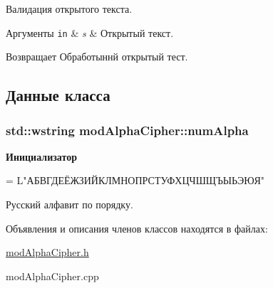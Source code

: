 Валидация открытого текста. 


\begin{DoxyParams}[1]{Аргументы}
\mbox{\tt in}  & {\em s} & Открытый текст. \\
\hline
\end{DoxyParams}
\begin{DoxyReturn}{Возвращает}
Обработыннй открытый тест. 
\end{DoxyReturn}


\subsection{Данные класса}
\subsubsection[{\texorpdfstring{num\+Alpha}{numAlpha}}]{\setlength{\rightskip}{0pt plus 5cm}std\+::wstring mod\+Alpha\+Cipher\+::num\+Alpha\hspace{0.3cm}{\ttfamily [private]}}\hypertarget{classmodAlphaCipher_ab7e0c7d3c87f4c8b7435d84f31c6cb62}{}\label{classmodAlphaCipher_ab7e0c7d3c87f4c8b7435d84f31c6cb62}
{\bfseries Инициализатор}
\begin{DoxyCode}
=
        L\textcolor{stringliteral}{"АБВГДЕЁЖЗИЙКЛМНОПРСТУФХЦЧШЩЪЫЬЭЮЯ"}
\end{DoxyCode}


Русский алфавит по порядку. 



Объявления и описания членов классов находятся в файлах\+:\begin{DoxyCompactItemize}
\item 
\hyperlink{modAlphaCipher_8h}{mod\+Alpha\+Cipher.\+h}\item 
mod\+Alpha\+Cipher.\+cpp\end{DoxyCompactItemize}
